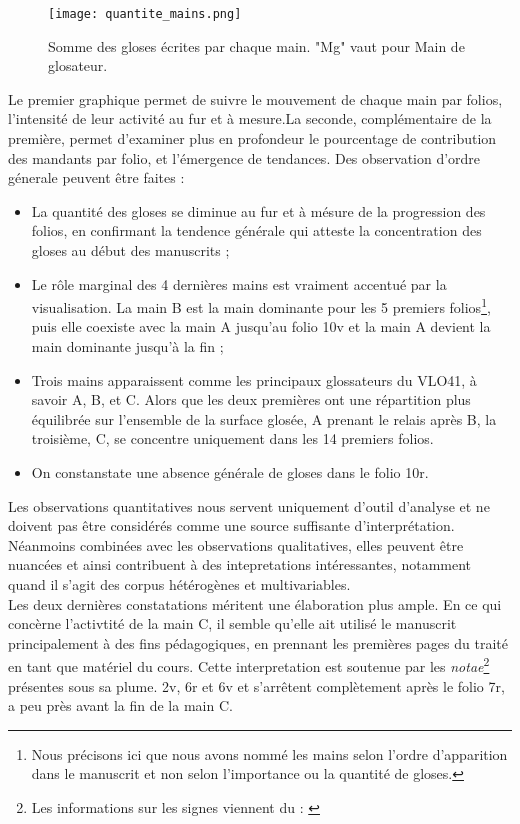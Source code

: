 \documentclass[a4paper, twoside, 12pt]{book}
\begin{document}
\begin{figure}[H]
    \centering
    \texttt{[image: quantite\_mains.png]}
    \caption{Somme des gloses écrites par chaque main. "Mg" vaut pour Main de glosateur.}
\end{figure}


Le premier graphique permet de suivre le mouvement de chaque main par folios, l'intensité de leur activité au fur et à mesure.La seconde, complémentaire de la première, permet d'examiner plus en profondeur le pourcentage de contribution des mandants par folio, et l'émergence de tendances. Des observation d'ordre génerale peuvent être faites :

\begin{itemize}
    \item La quantité des gloses se diminue au fur et à mésure de la progression des folios, en confirmant la tendence générale qui atteste la concentration des gloses au début des manuscrits ;
    \item Le rôle marginal des 4 dernières mains est vraiment accentué par la visualisation. La main B est la main dominante pour les 5 premiers folios\footnote{Nous précisons ici que nous avons nommé les mains selon l'ordre d'apparition dans le manuscrit et non selon l'importance ou la quantité de gloses.}, puis elle coexiste avec la main A jusqu'au folio 10v et la main A devient la main dominante jusqu'à la fin ;
    \item Trois mains apparaissent comme les principaux glossateurs du VLO41, à savoir A, B, et C. Alors que les deux premières ont une répartition plus équilibrée sur l'ensemble de la surface glosée, A prenant le relais après B, la troisième, C, se concentre uniquement dans les 14 premiers folios.
    \item On constanstate une absence générale de gloses dans le folio 10r.
\end{itemize}

Les observations quantitatives nous servent uniquement d'outil d'analyse et ne doivent pas être considérés comme une source suffisante d'interprétation. Néanmoins combinées avec les observations qualitatives, elles peuvent être nuancées et ainsi contribuent à des intepretations intéressantes, notamment quand il s'agit des corpus hétérogènes et multivariables. \\

Les deux dernières constatations méritent une élaboration plus ample. En ce qui concèrne l'activtité de la main C, il semble qu'elle ait utilisé le manuscrit principalement à des fins pédagogiques, en prennant les premières pages du traité en tant que matériel du cours. Cette interpretation est soutenue par les \textit{notae}\footnote{Les informations sur les signes viennent du : \cite{steinova2016notam}} présentes sous sa plume. 2v, 6r et 6v et s'arrêtent complètement après le folio 7r, a peu près avant la fin de la main C.
\end{document}
